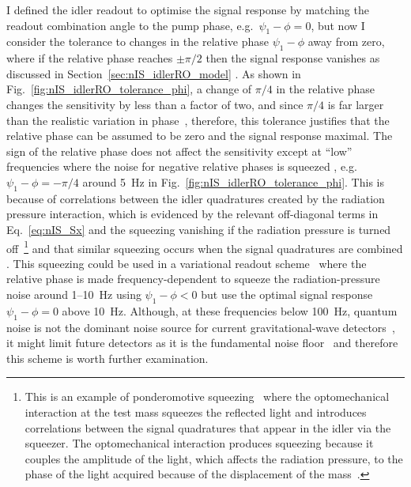 I defined the idler readout to optimise the signal response by matching the readout combination angle to the pump phase, e.g.\ $\psi_1-\phi=0$, but now I consider the tolerance to changes in the relative phase $\psi_1-\phi$ away from zero, where if the relative phase reaches $\pm\pi/2$ then the signal response vanishes as discussed in Section~\ref{sec:nIS_idlerRO_model} .
As shown in Fig.~\ref{fig:nIS_idlerRO_tolerance_phi}, a change of $\pi/4$ in the relative phase changes the sensitivity by less than a factor of two, and since $\pi/4$ is far larger than the realistic variation in phase~\cite{}, therefore, this tolerance justifies that the relative phase can be assumed to be zero and the signal response maximal. %
The sign of the relative phase does not affect the sensitivity except at ``low'' frequencies where the noise for negative relative phases is squeezed , e.g.\ $\psi_1-\phi=-\pi/4$ around 5~Hz in Fig.~\ref{fig:nIS_idlerRO_tolerance_phi}. This is because of correlations between the idler quadratures created by the radiation pressure interaction, which is evidenced by the relevant off-diagonal terms in Eq.~\ref{eq:nIS_Sx} and the squeezing vanishing if the radiation pressure is turned off~\footnote{This is an example of ponderomotive squeezing~\cite{} where the optomechanical interaction at the test mass squeezes the reflected light and introduces correlations between the signal quadratures that appear in the idler via the squeezer. The optomechanical interaction produces squeezing because it couples the amplitude of the light, which affects the radiation pressure, to the phase of the light acquired because of the displacement of the mass~\cite{}. } and that similar squeezing occurs when the signal quadratures are combined .
This squeezing could be used in a variational readout scheme~\cite{MiaoCQC?} where the relative phase is made frequency-dependent to squeeze the radiation-pressure noise around 1--10~Hz using $\psi_1-\phi<0$ but use the optimal signal response $\psi_1-\phi=0$ above 10~Hz. Although, at these frequencies below 100~Hz, quantum noise is not the dominant noise source for current gravitational-wave detectors~\cite{}, it might limit future detectors as it is the fundamental noise floor~\cite{} and therefore this scheme is worth further examination.
